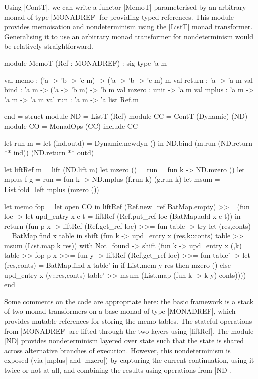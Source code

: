 Using |ContT|, we can write a functor |MemoT| parameterised by 
an arbitrary monad of type |MONADREF| for providing typed references. This
module provides memoisation and nondeterminism using the |ListT| monad transformer.
Generalising it to use an arbitrary monad transformer for nondeterminism would
be relatively straightforward.
\begin{ocaml}
	module MemoT (Ref : MONADREF) : sig
		type 'a m

		val memo  : ('a -> 'b -> 'c m) -> ('a -> 'b -> 'c m) m
		val return : 'a -> 'a m
		val bind   : 'a m -> ('a -> 'b m) -> 'b m
		val mzero  : unit -> 'a m
		val mplus  : 'a m -> 'a m -> 'a m
		val run    : 'a m -> 'a list Ref.m

	end = struct
		module ND = ListT (Ref)
		module CC = ContT (Dynamic) (ND)
    module CO = MonadOps (CC)
		include CC

		let run m =
			let (ind,outd) = Dynamic.newdyn () in
			ND.bind (m.run (ND.return ** ind)) (ND.return ** outd)

		let liftRef m  = lift (ND.lift m)
		let mzero ()  = {{run = fun k -> ND.mzero ()}}
		let mplus f g = {{run = fun k -> ND.mplus (f.run k) (g.run k)}}
		let msum      = List.fold_left mplus (mzero ())

		let memo fop = let open CO in
			liftRef (Ref.new_ref BatMap.empty) >>= (fun loc ->
			let upd_entry x e t = liftRef (Ref.put_ref loc (BatMap.add x e t)) in
			return (fun p x ->
				liftRef (Ref.get_ref loc) >>= fun table ->
				try let (res,conts) = BatMap.find x table in
					shift (fun k -> upd_entry x (res,k::conts) table >>
													msum (List.map k res))
				with Not_found ->
					shift (fun k -> upd_entry x ({},{k}) table >>
													fop p x >>= fun y ->
													liftRef (Ref.get_ref loc) >>= fun table' ->
													let (res,conts) = BatMap.find x table' in
													if List.mem y res then mzero ()
													else upd_entry x (y::res,conts) table' >>
															 msum (List.map (fun k -> k y) conts))))
	end
\end{ocaml}
Some comments on the code are appropriate here: the basic framework is
a stack of two monad transformers on a base monad of type |MONADREF|, which
provides mutable references for storing the memo tables. The stateful
operations from |MONADREF| are lifted through the two layers using |liftRef|. 
The module |ND| provides nondeterminism layered over state such that the state
is shared across alternative branches of execution. However, this nondeterminism
is exposed (via |mplus| and |mzero|) by capturing the current continuation, using 
it twice or not at all, and combining the results using operations from |ND|.


